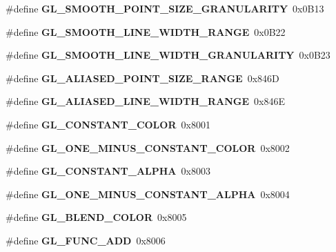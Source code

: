 \begin{DoxyCompactItemize}
\item 
\#define {\bfseries G\+L\+\_\+\+S\+M\+O\+O\+T\+H\+\_\+\+P\+O\+I\+N\+T\+\_\+\+S\+I\+Z\+E\+\_\+\+G\+R\+A\+N\+U\+L\+A\+R\+I\+T\+Y}~0x0\+B13\label{_s_d_l__opengl_8h_ad452d03588a8433130ea344b22478b8f}

\item 
\#define {\bfseries G\+L\+\_\+\+S\+M\+O\+O\+T\+H\+\_\+\+L\+I\+N\+E\+\_\+\+W\+I\+D\+T\+H\+\_\+\+R\+A\+N\+G\+E}~0x0\+B22\label{_s_d_l__opengl_8h_af56abdbd62a3b09f6bf0f2d42be34443}

\item 
\#define {\bfseries G\+L\+\_\+\+S\+M\+O\+O\+T\+H\+\_\+\+L\+I\+N\+E\+\_\+\+W\+I\+D\+T\+H\+\_\+\+G\+R\+A\+N\+U\+L\+A\+R\+I\+T\+Y}~0x0\+B23\label{_s_d_l__opengl_8h_aa5db837b996108c90673c2bc27976301}

\item 
\#define {\bfseries G\+L\+\_\+\+A\+L\+I\+A\+S\+E\+D\+\_\+\+P\+O\+I\+N\+T\+\_\+\+S\+I\+Z\+E\+\_\+\+R\+A\+N\+G\+E}~0x846\+D\label{_s_d_l__opengl_8h_a36db9789a611e54ea050f1368a5f38d7}

\item 
\#define {\bfseries G\+L\+\_\+\+A\+L\+I\+A\+S\+E\+D\+\_\+\+L\+I\+N\+E\+\_\+\+W\+I\+D\+T\+H\+\_\+\+R\+A\+N\+G\+E}~0x846\+E\label{_s_d_l__opengl_8h_aeab1bea19aab745e66b39860f3b8409c}

\item 
\#define {\bfseries G\+L\+\_\+\+C\+O\+N\+S\+T\+A\+N\+T\+\_\+\+C\+O\+L\+O\+R}~0x8001\label{_s_d_l__opengl_8h_a44a85282cd9022542edd9b29b44b4221}

\item 
\#define {\bfseries G\+L\+\_\+\+O\+N\+E\+\_\+\+M\+I\+N\+U\+S\+\_\+\+C\+O\+N\+S\+T\+A\+N\+T\+\_\+\+C\+O\+L\+O\+R}~0x8002\label{_s_d_l__opengl_8h_aa9fd0672b1352e0a68a7cf268df3734e}

\item 
\#define {\bfseries G\+L\+\_\+\+C\+O\+N\+S\+T\+A\+N\+T\+\_\+\+A\+L\+P\+H\+A}~0x8003\label{_s_d_l__opengl_8h_aa8e645785d8215f658c2576d90df1e5d}

\item 
\#define {\bfseries G\+L\+\_\+\+O\+N\+E\+\_\+\+M\+I\+N\+U\+S\+\_\+\+C\+O\+N\+S\+T\+A\+N\+T\+\_\+\+A\+L\+P\+H\+A}~0x8004\label{_s_d_l__opengl_8h_a316d4feb613d04854aba437a278add28}

\item 
\#define {\bfseries G\+L\+\_\+\+B\+L\+E\+N\+D\+\_\+\+C\+O\+L\+O\+R}~0x8005\label{_s_d_l__opengl_8h_aaeb7ae1c6700f8dc186672a2abdd825e}

\item 
\#define {\bfseries G\+L\+\_\+\+F\+U\+N\+C\+\_\+\+A\+D\+D}~0x8006\label{_s_d_l__opengl_8h_af477e4fa3e741406c0c3532cc5062758}


\end{DoxyCompactItemize}
